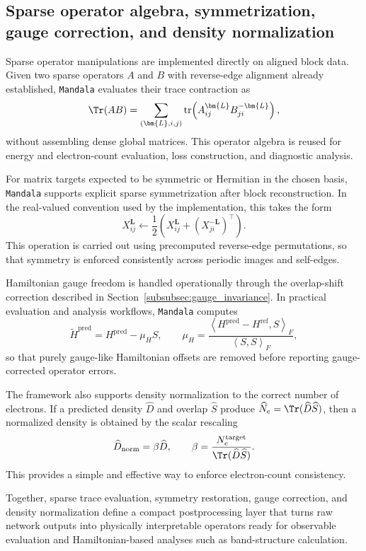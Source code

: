 \subsection{Sparse operator algebra, symmetrization, gauge correction, and density normalization}
\label{subsec:postprocessing}

Sparse operator manipulations are implemented directly on aligned block data.
Given two sparse operators $A$ and $B$ with reverse-edge alignment already
established, \texttt{Mandala} evaluates their trace contraction as
\begin{equation}
\Tr(AB)
=
\sum_{(\bm{L},i,j)}
\mathrm{tr}\!\left(A_{ij}^{\bm{L}} B_{ji}^{-\bm{L}}\right),
\end{equation}
without assembling dense global matrices. This operator algebra is reused for
energy and electron-count evaluation, loss construction, and diagnostic
analysis.

For matrix targets expected to be symmetric or Hermitian in the chosen basis,
\texttt{Mandala} supports explicit sparse symmetrization after block reconstruction. In
the real-valued convention used by the implementation, this takes the
form
\begin{equation}
X_{ij}^{\bm{L}}
\leftarrow
\frac{1}{2}
\left(
X_{ij}^{\bm{L}} + \left(X_{ji}^{-\bm{L}}\right)^{\top}
\right).
\end{equation}
This operation is carried out using precomputed reverse-edge permutations, so
that symmetry is enforced consistently across periodic images and self-edges.

Hamiltonian gauge freedom is handled operationally through the overlap-shift
correction described in Section~\ref{subsubsec:gauge_invariance}. In practical
evaluation and analysis workflows, \texttt{Mandala} computes
\begin{equation}
\widetilde{H}^{\mathrm{pred}}
=
H^{\mathrm{pred}} - \mu_H S,
\qquad
\mu_H
=
\frac{
\left\langle H^{\mathrm{pred}} - H^{\mathrm{ref}}, S \right\rangle_F
}{
\left\langle S, S \right\rangle_F
},
\end{equation}
so that purely gauge-like Hamiltonian offsets are removed before reporting
gauge-corrected operator errors.

The framework also supports density normalization to the correct number of
electrons. If a predicted density $\widehat{D}$ and overlap $\widehat{S}$
produce
$\widehat{N}_e = \Tr(\widehat{D}\widehat{S})$, then a normalized density is
obtained by the scalar rescaling
\begin{equation}
\widehat{D}_{\mathrm{norm}}
=
\beta \widehat{D},
\qquad
\beta = \frac{N_e^{\mathrm{target}}}{\Tr(\widehat{D}\widehat{S})}.
\end{equation}
This provides a simple and effective way to enforce electron-count consistency.

Together, sparse trace evaluation, symmetry restoration, gauge correction, and
density normalization define a compact postprocessing layer that turns raw
network outputs into physically interpretable operators ready for observable
evaluation and Hamiltonian-based analyses such as band-structure calculation.
